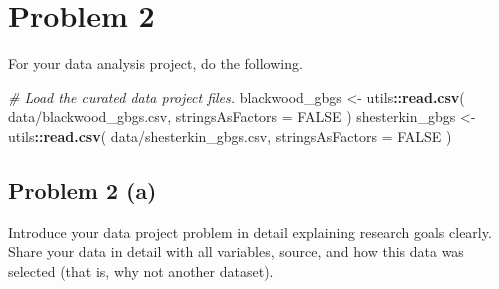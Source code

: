 \documentclass[
  10pt,
]{extarticle}
\newenvironment{Shaded}{\begin{snugshade}}{\end{snugshade}}
\newcommand{\AttributeTok}[1]{\textcolor[rgb]{0.13,0.29,0.53}{#1}}
\newcommand{\CommentTok}[1]{\textcolor[rgb]{0.56,0.35,0.01}{\textit{#1}}}
\newcommand{\ConstantTok}[1]{\textcolor[rgb]{0.56,0.35,0.01}{#1}}
\newcommand{\FunctionTok}[1]{\textcolor[rgb]{0.13,0.29,0.53}{\textbf{#1}}}
\newcommand{\NormalTok}[1]{#1}
\newcommand{\OtherTok}[1]{\textcolor[rgb]{0.56,0.35,0.01}{#1}}
\newcommand{\SpecialCharTok}[1]{\textcolor[rgb]{0.81,0.36,0.00}{\textbf{#1}}}
\newcommand{\StringTok}[1]{\textcolor[rgb]{0.31,0.60,0.02}{#1}}
\begin{document}
\newpage

\section{Problem 2}\label{problem-2}

\begin{problem}[Problem 2]
For your data analysis project, do the following.
\end{problem}

\begin{Shaded}
\begin{Highlighting}[]
\CommentTok{\# Load the curated data project files.}
\NormalTok{blackwood\_gbgs }\OtherTok{\textless{}{-}}\NormalTok{ utils}\SpecialCharTok{::}\FunctionTok{read.csv}\NormalTok{(}
  \StringTok{\textquotesingle{}data/blackwood\_gbgs.csv\textquotesingle{}}\NormalTok{,}
  \AttributeTok{stringsAsFactors =} \ConstantTok{FALSE}
\NormalTok{)}
\NormalTok{shesterkin\_gbgs }\OtherTok{\textless{}{-}}\NormalTok{ utils}\SpecialCharTok{::}\FunctionTok{read.csv}\NormalTok{(}
  \StringTok{\textquotesingle{}data/shesterkin\_gbgs.csv\textquotesingle{}}\NormalTok{,}
  \AttributeTok{stringsAsFactors =} \ConstantTok{FALSE}
\NormalTok{)}
\end{Highlighting}
\end{Shaded}

\newpage

\subsection{Problem 2 (a)}\label{problem-2-a}

\begin{problem}[Problem 2 (a)]
Introduce your data project problem in detail explaining research goals clearly. Share your data in detail with all variables, source, and how this data was selected (that is, why not another dataset).
\end{problem}
\end{document}
